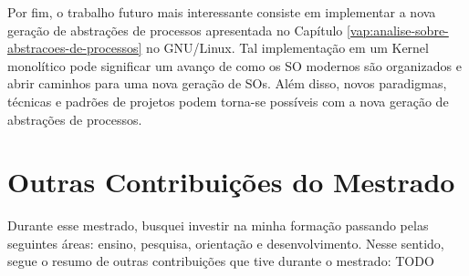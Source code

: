Por fim, o trabalho futuro mais interessante consiste em implementar a nova
geração de abstrações de processos apresentada no Capítulo
\ref{vap:analise-sobre-abstracoes-de-processos} no GNU/Linux. Tal implementação
em um Kernel monolítico pode significar um avanço de como os SO modernos são
organizados e abrir caminhos para uma nova geração de SOs. Além disso, novos
paradigmas, técnicas e padrões de projetos podem torna-se possíveis com a nova
geração de abstrações de processos.

\section{Outras Contribuições do Mestrado}

Durante esse mestrado, busquei investir na minha formação passando pelas
seguintes áreas: ensino, pesquisa, orientação e desenvolvimento. Nesse sentido,
segue o resumo de outras contribuições que tive durante o mestrado: TODO
